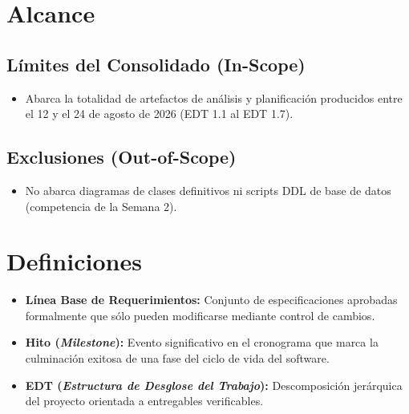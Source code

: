\documentclass[12pt,a4paper]{article}
\begin{document}
\section{Alcance}

\subsection{Límites del Consolidado (In-Scope)}
\begin{itemize}[leftmargin=1.5em, itemsep=2pt]
    \item Abarca la totalidad de artefactos de análisis y planificación producidos entre el 12 y el 24 de agosto de 2026 (EDT 1.1 al EDT 1.7).
\end{itemize}

\subsection{Exclusiones (Out-of-Scope)}
\begin{itemize}[leftmargin=1.5em, itemsep=2pt]
    \item No abarca diagramas de clases definitivos ni scripts DDL de base de datos (competencia de la Semana 2).
\end{itemize}

\section{Definiciones}
\begin{itemize}[leftmargin=1.5em, itemsep=2pt]
    \item \textbf{Línea Base de Requerimientos:} Conjunto de especificaciones aprobadas formalmente que sólo pueden modificarse mediante control de cambios.
    \item \textbf{Hito (\textit{Milestone}):} Evento significativo en el cronograma que marca la culminación exitosa de una fase del ciclo de vida del software.
    \item \textbf{EDT (\textit{Estructura de Desglose del Trabajo}):} Descomposición jerárquica del proyecto orientada a entregables verificables.
\end{itemize}
\end{document}
